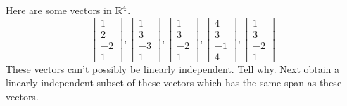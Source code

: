 \documentclass{ximera}
\begin{document}
\begin{problem}\label{prb:3.26} Here are some vectors in $\mathbb{R}^{4}$.
\begin{equation*}
\left[
\begin{array}{r}
1 \\
2 \\
-2 \\
1
\end{array}
\right] ,\left[
\begin{array}{r}
1 \\
3 \\
-3 \\
1
\end{array}
\right] ,\left[
\begin{array}{r}
1 \\
3 \\
-2 \\
1
\end{array}
\right] ,\left[
\begin{array}{r}
4 \\
3 \\
-1 \\
4
\end{array}
\right] ,\left[
\begin{array}{r}
1 \\
3 \\
-2 \\
1
\end{array}
\right]
\end{equation*}
These vectors can't possibly be linearly independent. Tell why. Next obtain a
linearly independent subset of these vectors which has the same span as
these vectors. 
\end{problem}
\end{document}
